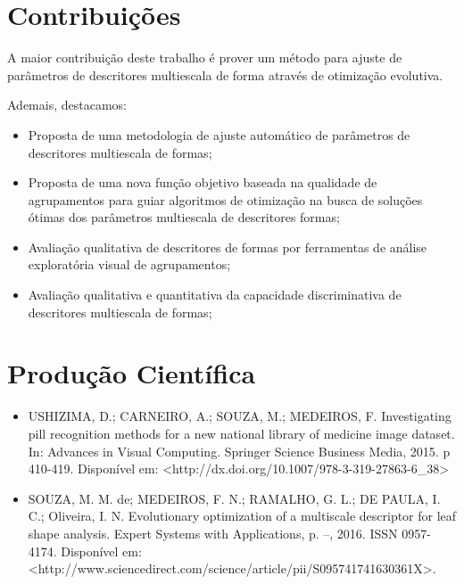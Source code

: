 \section{Contribuições \label{sec:contrib}}

A maior contribuição deste trabalho é prover um método para ajuste de parâmetros de descritores multiescala de forma através de otimização evolutiva.

Ademais, destacamos:

\begin{itemize}

\item Proposta de uma metodologia de ajuste automático de parâmetros de descritores multiescala de formas;

\item Proposta de uma nova função objetivo baseada na qualidade de agrupamentos para guiar  algoritmos de otimização na busca de soluções ótimas dos parâmetros multiescala de descritores formas; 

\item Avaliação qualitativa de descritores de formas por ferramentas de análise exploratória visual de agrupamentos;

\item Avaliação qualitativa e quantitativa da capacidade discriminativa de descritores multiescala de formas;

\end{itemize}



\section {Produção Científica \label{sec:prod_cientif}}
\begin{itemize}

\item USHIZIMA, D.; CARNEIRO, A.; SOUZA, M.; MEDEIROS, F. Investigating pill recognition methods for a new national library of
medicine image dataset. In: Advances in Visual Computing. Springer Science Business Media, 2015. p 410-419. Disponível em: <http://dx.doi.org/10.1007/978-3-319-27863-6\_38>

\item SOUZA, M. M. de; MEDEIROS, F. N.; RAMALHO, G. L.; DE PAULA, I. C.; Oliveira, I. N. Evolutionary optimization of a multiscale descriptor for leaf
shape analysis. Expert Systems with Applications, p. –, 2016. ISSN 0957-4174. Disponível
em: <http://www.sciencedirect.com/science/article/pii/S095741741630361X>.

\end{itemize}
